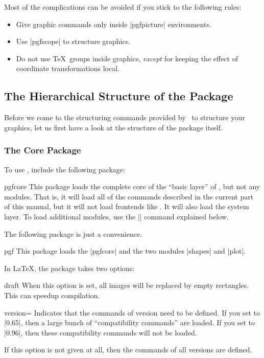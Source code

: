 Most of the complications can be avoided if you stick to the following
rules:

\begin{itemize}
\item
  Give graphic commands only inside |{pgfpicture}| environments.
\item
  Use |{pgfscope}| to structure graphics.
\item
  Do not use \TeX\ groups inside graphics, \emph{except} for keeping
  the effect of coordinate transformations local.
\end{itemize}




\subsection{The Hierarchical Structure of the Package}

Before we come to the structuring commands provided by \pgfname\ to
structure your graphics, let us first have a look at the structure of
the package itself.

\subsubsection{The Core Package}

To use \pgfname, include the following package:

\begin{package}{pgfcore}
  This package loads the complete core of the ``basic layer'' of
  \pgfname, but not any modules. That is, it will load all of the
  commands described in the current part of this manual, but it will
  not load frontends like \tikzname. It will also load the system
  layer. To load additional modules, use the |\usepgfmodule| command
  explained below.
\end{package}

The following package is just a convenience.

\begin{package}{pgf}
  This package loads the |pgfcore| and the two modules |shapes| and
  |plot|.

  In \LaTeX, the package takes two options:
  \begin{packageoption}{draft}
    When this option is set, all images will be replaced by empty
    rectangles. This can speedup compilation.
  \end{packageoption}

  \begin{packageoption}{version=}
    Indicates that the commands of version  need to be
    defined. If you set  to |0.65|, then a large bunch of
    ``compatibility commands'' are loaded. If you set  to
    |0.96|, then these compatibility commands will not be loaded.

    If this option is not given at all, then the commands of all
    versions are defined.
  \end{packageoption}
\end{package}



